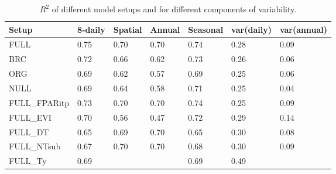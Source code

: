 \documentclass{myreport}
\begin{document}
\begin{table}
\centering
\begin{tabular}{lllllll}
  \toprule
  Setup & 8-daily & Spatial & Annual & Seasonal & var(daily) & var(annual) \\ 
  \midrule
  FULL & 0.75 & 0.70 & 0.70 & 0.74 & 0.28 & 0.09 \\ 
  BRC & 0.72 & 0.66 & 0.62 & 0.73 & 0.26 & 0.06 \\ 
  ORG & 0.69 & 0.62 & 0.57 & 0.69 & 0.25 & 0.06 \\ 
  NULL & 0.69 & 0.64 & 0.58 & 0.71 & 0.25 & 0.04 \\ 
  \midrule
  FULL\_FPARitp & 0.73 & 0.70 & 0.70 & 0.74 & 0.25 & 0.09 \\ 
  FULL\_EVI & 0.70 & 0.56 & 0.47 & 0.72 & 0.29 & 0.14 \\ 
  \midrule
  FULL\_DT & 0.65 & 0.69 & 0.70 & 0.65 & 0.30 & 0.08 \\ 
  FULL\_NTsub & 0.67 & 0.70 & 0.70 & 0.68 & 0.30 & 0.09 \\ 
  FULL\_Ty & 0.69 &  &  & 0.69 & 0.49 & \\ 
  \bottomrule
  \end{tabular}
\caption{$R^2$ of different model setups and for different components of variability.} 
\label{tab:rsq}
\end{table}


\end{document}
